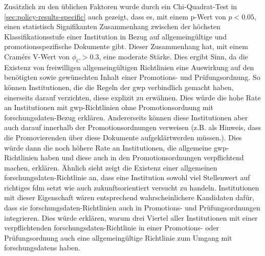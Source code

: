 Zusätzlich zu den üblichen Faktoren wurde durch ein Chi-Quadrat-Test in \cref{sec:policy-results-specific} auch gezeigt, dass es, mit einem p-Wert von $p<\num{0,05}$, einen statistisch Signifikanten Zusammenhang zwischen der höchsten Klassifikationsstufe einer Institution in Bezug auf allgemeingültige und promotionsspezifische Dokumente gibt.
Dieser Zusammenhang hat, mit einem Cramérs V-Wert von $\phi_C>\num{0.3}$, eine moderate Stärke.
Dies ergibt Sinn, da die Existenz von freiwilligen allgemeingültigen Richtlinien eine Auswirkung auf den benötigten sowie gewünschten Inhalt einer Promotions- und Prüfungsordnung.
So können Institutionen, die die Regeln der \gls{gwp} verbindlich gemacht haben, einerseits darauf verzichten, diese explizit zu erwähnen.
Dies würde die hohe Rate an Institutionen mit \gls{gwp}-Richtlinien ohne Promotionsordnung mit \gls{forschungsdaten}-Bezug erklären.
Andererseits können diese Institutionen aber auch darauf innerhalb der Promotionsordnungen verweisen (z.B. als Hinweis, dass die Promovierenden über diese Dokumente aufgeklärtwerden müssen.).
Dies würde dann die noch höhere Rate an Institutionen, die allgemeine \gls{gwp}-Richtlinien haben und diese auch in den Promotionsordnungen verpflichtend machen, erklären.
Ähnlich sieht zeigt die Existenz einer allgemeinen \gls{forschungsdaten}-Richtlinie an, dass eine Institution sowohl viel Stellenwert auf richtiges \gls{fdm} setzt wie auch zukunftsorientiert versucht zu handeln.
Institutionen mit dieser Eigenschaft wären entsprechend wahrscheinlichere Kandidaten dafür, dass sie \gls{forschungsdaten}-Richtlinien auch in Promotions- und Prüfungsordnungen integrieren.
Dies würde erklären, warum drei Viertel aller Institutionen mit einer verpflichtenden \gls{forschungsdaten}-Richtlinie in einer Promotions- oder Prüfungsordnung auch eine allgemeingültige Richtlinie zum Umgang mit \glspl{forschungsdaten} haben.